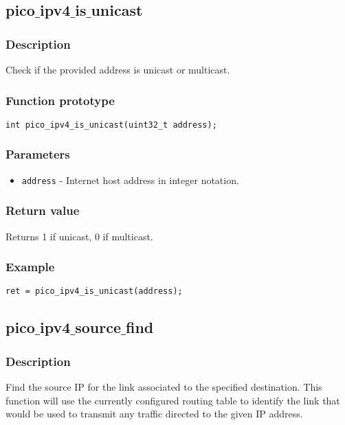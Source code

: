 \subsection{pico$\_$ipv4$\_$is$\_$unicast}

\subsubsection*{Description}
Check if the provided address is unicast or multicast.

\subsubsection*{Function prototype}
\begin{verbatim}
int pico_ipv4_is_unicast(uint32_t address);
\end{verbatim}

\subsubsection*{Parameters}
\begin{itemize}[noitemsep]
\item \texttt{address} - Internet host address in integer notation.
\end{itemize}

\subsubsection*{Return value}
Returns 1 if unicast, 0 if multicast.


\subsubsection*{Example}
\begin{verbatim}
ret = pico_ipv4_is_unicast(address);
\end{verbatim}



\subsection{pico$\_$ipv4$\_$source$\_$find}

\subsubsection*{Description}
Find the source IP for the link associated to the specified destination.
This function will use the currently configured routing table to identify the link that would be used to transmit any traffic directed to the given IP address.

